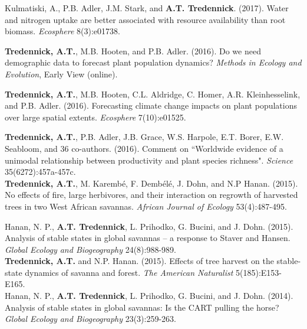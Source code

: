 \documentclass[margin,line]{resume}
\begin{document}
\begin{resume}
      Kulmatiski, A., P.B. Adler, J.M. Stark, and \textbf{A.T. Tredennick}. (2017). Water and nitrogen uptake are better associated with resource availability than root biomass. \emph{Ecosphere} 8(3):e01738.
	
	  \textbf{Tredennick, A.T.}, M.B. Hooten,  and P.B. Adler. (2016). Do we need demographic data to forecast plant population dynamics? \emph{Methods in Ecology and Evolution}, Early View (online).
	
	  \textbf{Tredennick, A.T.}, M.B. Hooten, C.L. Aldridge, C. Homer, A.R. Kleinhesselink, and P.B. Adler. (2016). Forecasting climate change impacts on plant populations over large spatial extents. \emph{Ecosphere} 7(10):e01525.
	
	\textbf{Tredennick, A.T.}, P.B. Adler, J.B. Grace, W.S. Harpole, E.T. Borer, E.W. Seabloom, and 36 co-authors. (2016). Comment on ``Worldwide evidence of a unimodal relationship between productivity and plant species richness". \textsl{Science} 35(6272):457a-457c. \vspace{-6mm}\\%
	
	\textbf{Tredennick, A.T.}, M. Karemb\'{e}, F. Demb\'{e}l\'{e}, J. Dohn, and N.P Hanan. (2015). No effects of fire, large herbivores, and their interaction on regrowth of harvested trees in two West African savannas. \textsl{African Journal of Ecology} 53(4):487-495. \vspace{-6mm}\\%
	
			\newpage{}
	
	Hanan, N. P., \textbf{A.T. Tredennick}, L. Prihodko, G. Bucini, and J. Dohn. (2015). Analysis of stable states in global savannas -- a response to Staver and Hansen. 	\textsl{Global Ecology and Biogeography} 24(8):988-989. \vspace{-6mm}\\%
   
     	\textbf{Tredennick, A.T.} and N.P. Hanan. (2015). Effects of tree harvest on the stable-state dynamics of savanna and forest. \textsl{The American Naturalist} 5(185):E153-E165. \vspace{-6mm} \\%
	
	Hanan, N. P., \textbf{A.T. Tredennick}, L. Prihodko, G. Bucini, and J. Dohn. (2014). Analysis of stable states in global savannas: Is the CART pulling the horse? 	\textsl{Global Ecology and Biogeography} 23(3):259-263. \vspace{-6mm}\\%
	

\end{resume}
\end{document}
